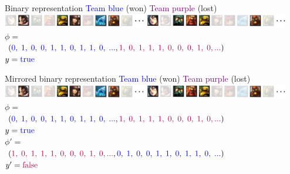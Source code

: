 \begin{frame}{Binary representation}
\centering
\textcolor{blue}{Team blue} (won) \hspace{40pt} \textcolor{purple}{Team purple} (lost)\\
\includegraphics[width=0.47\textwidth]{img/kent/pickblue.png}\hspace{2pt}%
\includegraphics[width=0.47\textwidth]{img/kent/pickpurple.png}\\
\vspace{18pt}
$\phi =$\\
\hspace{2pt} $(\textcolor{blue}{0,\;1,\;0,\;0,\;1,\;1,\;0,\;1,\;1,\;0,\;...},\textcolor{purple}{1,\;0,\;1,\;1,\;1,\;0,\;0,\;0,\;1,\;0,...})$\\
\vspace{18pt}
$y = \textcolor{blue}{\text{true}}$
\end{frame}

\begin{frame}{Mirrored binary representation}
\centering
\textcolor{blue}{Team blue} (won) \hspace{40pt} \textcolor{purple}{Team purple} (lost)\\
\includegraphics[width=0.47\textwidth]{img/kent/pickblue.png}\hspace{2pt}%
\includegraphics[width=0.47\textwidth]{img/kent/pickpurple.png}\\
\vspace{18pt}
$\phi =$\\
\hspace{2pt} $(\textcolor{blue}{0,\;1,\;0,\;0,\;1,\;1,\;0,\;1,\;1,\;0,\;...},\textcolor{purple}{1,\;0,\;1,\;1,\;1,\;0,\;0,\;0,\;1,\;0,...})$\\
$y = \textcolor{blue}{\text{true}}$\\
\vspace{18pt}
$\phi' =$\\
\hspace{2pt} $(\textcolor{purple}{1,\;0,\;1,\;1,\;1,\;0,\;0,\;0,\;1,\;0,...},\textcolor{blue}{0,\;1,\;0,\;0,\;1,\;1,\;0,\;1,\;1,\;0,\;...})$\\
$y' = \textcolor{purple}{\text{false}}$
\end{frame}

